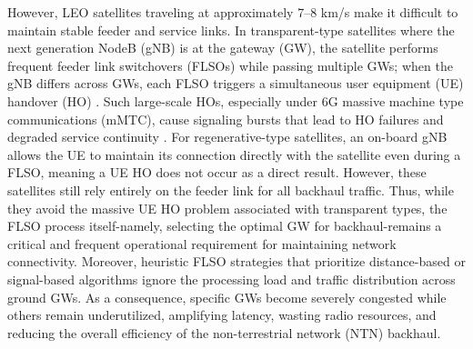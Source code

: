 However, LEO satellites traveling at approximately 7--8 km/s make it difficult to maintain stable feeder and service links. In transparent-type satellites where the next generation NodeB (gNB) is at the gateway (GW), the satellite performs frequent feeder link switchovers (FLSOs) while passing multiple GWs; when the gNB differs across GWs, each FLSO triggers a simultaneous user equipment (UE) handover (HO) \cite{3gppfeeder}. Such large-scale HOs, especially under 6G massive machine type communications (mMTC), cause signaling bursts that lead to HO failures and degraded service continuity \cite{ho_latency}.
For regenerative-type satellites, an on-board gNB allows the UE to maintain its connection directly with the satellite even during a FLSO, meaning a UE HO does not occur as a direct result. 
However, these satellites still rely entirely on the feeder link for all backhaul traffic. Thus, while they avoid the massive UE HO problem associated with transparent types, the FLSO process itself-namely, selecting the optimal GW for backhaul-remains a critical and frequent operational requirement for maintaining network connectivity.
Moreover, heuristic FLSO strategies that prioritize distance-based or signal-based algorithms ignore the processing load and traffic distribution across ground GWs. As a consequence, specific GWs become severely congested while others remain underutilized, amplifying latency, wasting radio resources, and reducing the overall efficiency of the non-terrestrial network (NTN) backhaul. %

